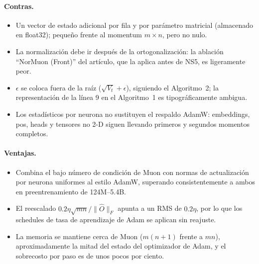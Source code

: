 \paragraph{Contras.}
\begin{itemize}[leftmargin=*]
\item Un vector de estado adicional por fila y por parámetro matricial (almacenado en
float32); pequeño frente al momentum $m \times n$, pero no nulo.
\item La normalización debe ir después de la ortogonalización: la ablación ``NorMuon
(Front)'' del artículo, que la aplica antes de NS5, es ligeramente peor.
\item $\epsilon$ se coloca fuera de la raíz ($\sqrt{V_t}+\epsilon$), siguiendo el
Algoritmo~2; la representación de la línea 9 en el Algoritmo~1 es tipográficamente
ambigua.
\item Los estadísticos por neurona no sustituyen el respaldo AdamW: embeddings, pos,
heads y tensores no 2-D siguen llevando primeros y segundos momentos completos.
\end{itemize}

\paragraph{Ventajas.}
\begin{itemize}[leftmargin=*]
\item Combina el bajo número de condición de Muon con normas de actualización por neurona
uniformes al estilo AdamW, superando consistentemente a ambos en preentrenamiento de
124M--5.4B.
\item El reescalado $0.2\eta\sqrt{mn}/\lVert\widehat{O}\rVert_F$ apunta a un RMS de
$0.2\eta$, por lo que los schedules de tasa de aprendizaje de Adam se aplican sin
reajuste.
\item La memoria se mantiene cerca de Muon ($m(n+1)$ frente a $mn$), aproximadamente la
mitad del estado del optimizador de Adam, y el sobrecosto por paso es de unos pocos por
ciento.
\end{itemize}

